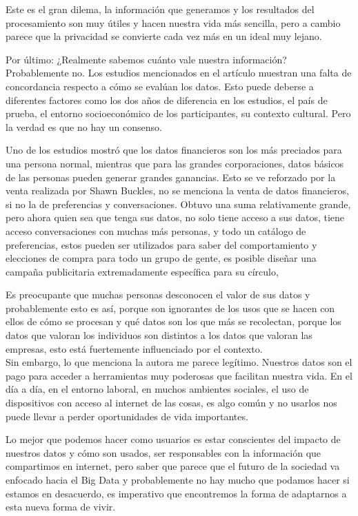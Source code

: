 \documentclass[12pt]{report}
\begin{document}
\begin{enumerate}[label=\textbf{\arabic*.}, leftmargin=*]
Este es el gran dilema, la información que generamos y los resultados del procesamiento son muy útiles y hacen nuestra vida más sencilla, pero a cambio parece que la privacidad se convierte cada vez más en un ideal muy lejano.

Por último: ¿Realmente sabemos cuánto vale nuestra información? Probablemente no. Los estudios mencionados en el artículo muestran una falta de concordancia respecto a cómo se evalúan los datos. Esto puede deberse a diferentes factores como los dos años de diferencia en los estudios, el país de prueba, el entorno socioeconómico de los participantes, su contexto cultural. Pero la verdad es que no hay un consenso.

Uno de los estudios mostró que los datos financieros son los más preciados para una persona normal, mientras que para las grandes corporaciones, datos básicos de las personas pueden generar grandes ganancias. Esto se ve reforzado por la venta realizada por Shawn Buckles,  no se menciona la venta de datos financieros, si no la de preferencias y conversaciones. Obtuvo una suma relativamente grande, pero ahora quien sea que tenga sus datos, no solo tiene acceso a sus datos, tiene acceso conversaciones con muchas más personas, y todo un catálogo de preferencias, estos pueden ser utilizados para saber del comportamiento y elecciones de compra para todo un grupo de gente, es posible diseñar una campaña publicitaria extremadamente específica para su círculo,

Es preocupante que muchas personas desconocen el valor de sus datos y probablemente esto es así, porque son ignorantes de los usos que se hacen con ellos de cómo se procesan y qué datos son los que más se recolectan,  porque los datos que valoran los individuos son distintos a los datos que valoran las empresas, esto está fuertemente influenciado por el contexto.\\

Sin embargo, lo que menciona la autora me parece legítimo. Nuestros datos son el pago para acceder a herramientas muy poderosas que facilitan nuestra vida. En el día a día, en el entorno laboral, en muchos ambientes sociales, el uso de dispositivos con acceso al internet de las cosas, es algo común y no usarlos nos puede llevar a perder oportunidades de vida importantes.

Lo mejor que podemos hacer como usuarios es estar conscientes del impacto de nuestros datos y cómo son usados, ser responsables con la información que compartimos en internet, pero saber que parece que el futuro de la sociedad va enfocado hacia el Big Data y probablemente no hay mucho que podamos hacer si estamos en desacuerdo, es imperativo que encontremos la forma de adaptarnos a esta nueva forma de vivir.

\end{enumerate}
\end{document}
